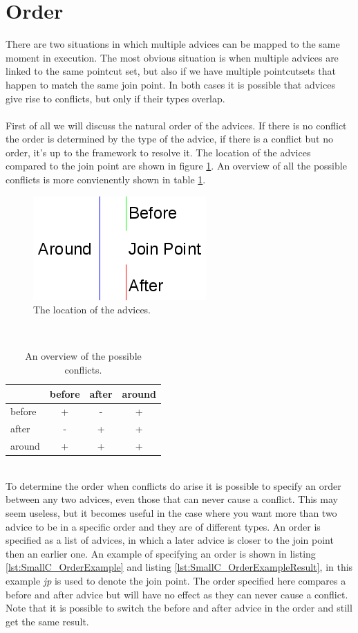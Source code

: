 \documentclass[a4paper]{report}
\begin{document}
\section{Order}
There are two situations in which multiple advices can be mapped to the same moment in execution. The most obvious situation is when multiple advices are linked to the same pointcut set, but also if we have multiple pointcutsets that happen to match the same join point. In both cases it is possible that advices give rise to conflicts, but only if their types overlap.\\
\\
First of all we will discuss the natural order of the advices. If there is no conflict the order is determined by the type of the advice, if there is a conflict but no order, it's up to the framework to resolve it. The location of the advices compared to the join point are shown in figure \ref{fig:COrder}. An overview of all the possible conflicts is more convienently shown in table \ref{tab:SmallC_Conflicts}.
\begin{figure}
\centering
\includegraphics[scale=0.7]{images/AOFC/Order.png}
\caption{The location of the advices.}
\label{fig:COrder}
\end{figure}\\
\begin{table}
\centering
\begin{tabular}{l|c|c|c|}
& before & after & around\\
\hline
before & + & - & + \\
\hline
after & - & + & + \\
\hline
around & + & + & +\\
\hline
\end{tabular}
\caption{An overview of the possible conflicts.}
\label{tab:SmallC_Conflicts}
\end{table}\\
To determine the order when conflicts do arise it is possible to specify an order between any two advices, even those that can never cause a conflict. This may seem useless, but it becomes useful in the case where you want more than two advice to be in a specific order and they are of different types. An order is specified as a list of advices, in which a later advice is closer to the join point then an earlier one. An example of specifying an order is shown in listing \ref{lst:SmallC_OrderExample} and listing \ref{lst:SmallC_OrderExampleResult}, in this example \textit{jp} is used to denote the join point. The order specified here compares a before and after advice but will have no effect as they can never cause a conflict. Note that it is possible to switch the before and after advice in the order and still get the same result.\\
\end{document}
